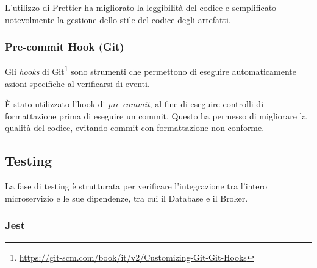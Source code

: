 L'utilizzo di Prettier ha migliorato la leggibilità del codice e semplificato notevolmente la gestione dello stile del codice degli artefatti.

%
%
%
\subsubsection{Pre-commit Hook (Git)}

Gli \emph{hooks} di Git\footnote{\url{https://git-scm.com/book/it/v2/Customizing-Git-Git-Hooks}} sono strumenti che permettono di eseguire automaticamente azioni specifiche al verificarsi di eventi.

È stato utilizzato l'hook di \emph{pre-commit}, al fine di eseguire controlli di formattazione prima di eseguire un commit.
%
Questo ha permesso di migliorare la qualità del codice, evitando commit con formattazione non conforme.
%


%
%
%
\subsection{Testing}

La fase di testing è strutturata per verificare l'integrazione tra l'intero microservizio e le sue dipendenze, tra cui il Database e il Broker.


%
%
%
\subsubsection{Jest}

